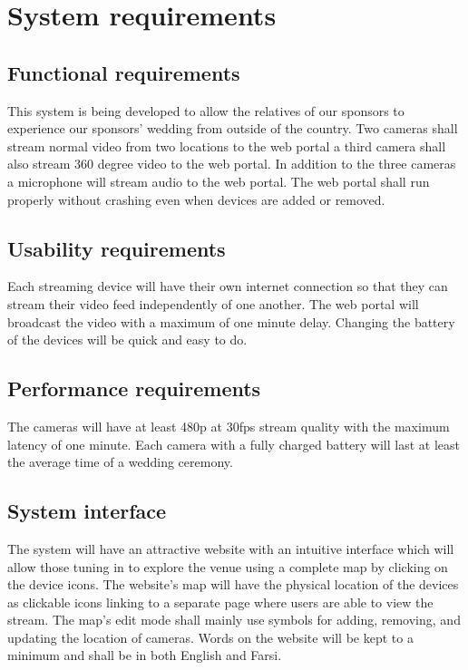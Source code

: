 \documentclass[onecolumn, draftclsnofoot,10pt, compsoc]{IEEEtran}
\begin{document}
\section{System requirements}
    \subsection{Functional requirements}
     This system is being developed to allow the relatives of our sponsors to experience our sponsors' wedding from outside of the country.
    Two cameras shall stream normal video from two locations to the web portal a third camera shall also stream 360 degree video to the web portal. In addition to the three cameras a microphone will stream audio to the web portal.
    The web portal shall run properly without crashing even when devices are added or removed.
    
    \subsection{Usability requirements}
    Each streaming device will have their own internet connection so that they can stream their video feed independently of one another.
    The web portal will broadcast the video with a maximum of one minute delay. Changing the battery of the devices will be quick and easy to do. 
    
    \subsection{Performance requirements}
    The cameras will have at least 480p at 30fps stream quality with the maximum latency of one minute. 
    Each camera with a fully charged battery will last at least the average time of a wedding ceremony. 
 
    
    \subsection{System interface}
    The system will have an attractive website with an intuitive interface which will allow those tuning in to explore the venue using a complete map by clicking on the device icons. 
    The website's map will have the physical location of the devices as clickable icons linking to a separate page where users are able to view the stream.
    The map's edit mode shall mainly use symbols for adding, removing, and updating the location of cameras. Words on the website will be kept to a minimum and shall be in both English and Farsi.
\end{document}

